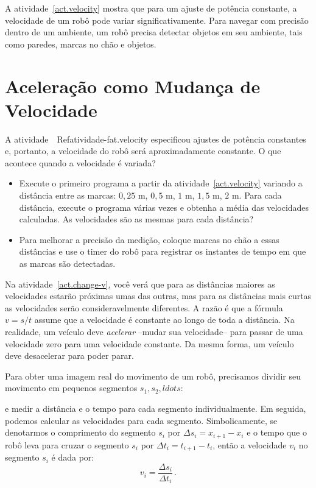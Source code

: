 A atividade~\ref{act.velocity} mostra que para um ajuste de potência constante, a velocidade de um robô pode variar significativamente. Para navegar com precisão dentro de um ambiente, um robô precisa detectar objetos em seu ambiente, tais como paredes, marcas no chão e objetos.

\section{Aceleração como Mudança de Velocidade}\label{s.acceleration}

A atividade~\ Ref{atividade-fat.velocity} especificou ajustes de potência constantes e, portanto, a velocidade do robô será aproximadamente constante. O que acontece quando a velocidade é variada?

\begin{framed}
\begin{itemize}
\item Execute o primeiro programa a partir da atividade~\ref{act.velocity} variando a distância entre as marcas: $0,25$ m, $0,5$ m, $1$ m, $1,5$ m, $2$ m. Para cada distância, execute o programa várias vezes e obtenha a média das velocidades calculadas. As velocidades são as mesmas para cada distância?
\item Para melhorar a precisão da medição, coloque marcas no chão a essas distâncias e use o timer do robô para registrar os instantes de tempo em que as marcas são detectadas.
\end{itemize}
\end{framed}

Na atividade~\ref{act.change-v}, você verá que para as distâncias maiores as velocidades estarão próximas umas das outras, mas para as distâncias mais curtas as velocidades serão consideravelmente diferentes. A razão é que a fórmula $v=s/t$ assume que a velocidade é constante ao longo de toda a distância. Na realidade, um veículo deve \emph{acelerar} --mudar sua velocidade-- para passar de uma velocidade zero para uma velocidade constante. Da mesma forma, um veículo deve desacelerar para poder parar.

Para obter uma imagem real do movimento de um robô, precisamos dividir seu movimento em pequenos segmentos $s_1,s_2,ldots$:
\begin{center}
\end{center}
e medir a distância e o tempo para cada segmento individualmente. Em seguida, podemos calcular as velocidades para cada segmento. Simbolicamente, se denotarmos o comprimento do segmento $s_i$ por $\Delta s_i = x_{i+1}-x_i$ e o tempo que o robô leva para cruzar o segmento $s_i$ por $\Delta t_i = t_{i+1}-t_i$, então a velocidade $v_i$ no segmento $s_i$ é dada por:
\[v_i = \frac{\Delta s_i}{\Delta t_i}\,.\]

